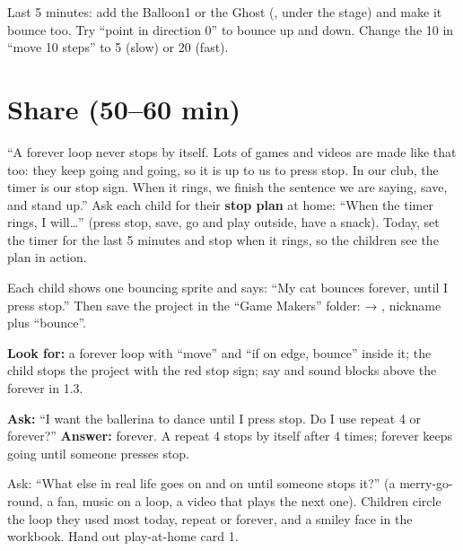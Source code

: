 \begin{freebuild}
Last 5 minutes: add the Balloon1 or the Ghost (, under the stage) and make it bounce too. Try \enquote{point in direction 0} to bounce up and down. Change the 10 in \enquote{move 10 steps} to 5 (slow) or 20 (fast).
\end{freebuild}

\section{Share (50--60 min)}
\begin{safety}
\enquote{A forever loop never stops by itself. Lots of games and videos are made like that too: they keep going and going, so it is up to us to press stop. In our club, the timer is our stop sign. When it rings, we finish the sentence we are saying, save, and stand up.} Ask each child for their \textbf{stop plan} at home: \enquote{When the timer rings, I will\ldots{}} (press stop, save, go and play outside, have a snack). Today, set the timer for the last 5 minutes and stop when it rings, so the children see the plan in action.
\end{safety}

\begin{teacherscript}
Each child shows one bouncing sprite and says: \enquote{My cat bounces forever, until I press stop.} Then save the project in the \enquote{Game Makers} folder:  → , nickname plus \enquote{bounce}.
\end{teacherscript}

\begin{formativecheck}
\textbf{Look for:} a forever loop with \enquote{move} and \enquote{if on edge, bounce} inside it; the child stops the project with the red stop sign; say and sound blocks above the forever in 1.3.

\textbf{Ask:} \enquote{I want the ballerina to dance until I press stop. Do I use repeat 4 or forever?}
\textbf{Answer:} forever. A repeat 4 stops by itself after 4 times; forever keeps going until someone presses stop.
\end{formativecheck}

\begin{reflection}
Ask: \enquote{What else in real life goes on and on until someone stops it?} (a merry-go-round, a fan, music on a loop, a video that plays the next one). Children circle the loop they used most today, repeat or forever, and a smiley face in the workbook. Hand out play-at-home card 1.
\end{reflection}

